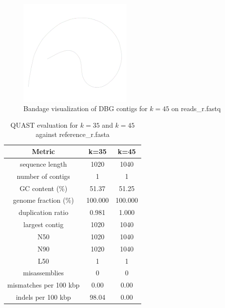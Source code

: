 \documentclass[12pt]{article}
\begin{document}
\begin{figure}[h!]
    \centering
    \includegraphics[width=0.5\textwidth]{../toy_dataset/r-k-45.png}
    \caption{Bandage visualization of DBG contigs for $k=45$ on reads\_r.fastq}
    \label{fig:dbg_k_45}
\end{figure} 

\begin{table}[h!]
\begin{center}
\begin{tabular}{ |c|c|c| }
    \hline
    Metric & k=35 & k=45 \\
    \hline
    sequence length & 1020 & 1040 \\
    number of contigs & 1 & 1 \\
    GC content (\%) & 51.37 & 51.25 \\
    genome fraction (\%) & 100.000 & 100.000 \\
    duplication ratio & 0.981 & 1.000 \\
    largest contig & 1020 & 1040 \\
    N50 & 1020 & 1040 \\
    N90 & 1020 & 1040 \\
    L50 & 1 & 1 \\
    misassemblies & 0 & 0 \\
    mismatches per 100 kbp & 0.00 & 0.00 \\
    indels per 100 kbp & 98.04 & 0.00 \\
    \hline
\end{tabular}
\caption{QUAST evaluation for $k=35$ and $k=45$ against reference\_r.fasta}
\label{tab:quast_k35_k45}
\end{center}
\end{table}
\end{document}
